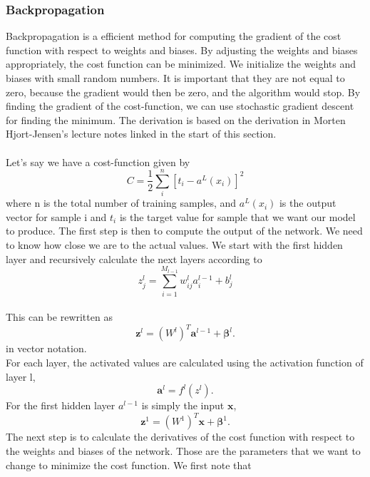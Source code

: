 \subsubsection{Backpropagation}
Backpropagation is a efficient method for computing the gradient of the cost function with respect to weights and biases. By adjusting the weights and biases appropriately, the cost function can be minimized. We initialize the weights and biases with small random numbers. It is important that they are not equal to zero, because the gradient would then be zero, and the algorithm would stop. By finding the gradient of the cost-function, we can use stochastic gradient descent for finding the minimum. The derivation is based on the derivation in Morten Hjort-Jensen's lecture notes linked in the start of this section. 
\\
\\
Let's say we have a cost-function given by 
\begin{equation}
    C = \frac{1}{2}\sum_i^n [t_i - a^L(x_i)]^2
\end{equation}
where n is the total number of training samples, and $a^L(x_i)$ is the output vector for sample i and $t_i$ is the target value for sample that we want our model to produce. 
The first step is then to compute the output of the network. We need to know how close we are to the actual values. We start with the first hidden layer and recursively calculate the next layers according to
\begin{equation}
    z_j^l = \sum_{i=1}^{M_{l-1}}w_{ij}^l a_i^{l-1} + b_j^l
\end{equation}
\\
This can be rewritten as 
\begin{equation}
    \boldsymbol{z}^l = (W^l)^T \boldsymbol{a}^{l-1} + \boldsymbol{\beta}^l.
\end{equation}
in vector notation.
\\
For each layer, the activated values are calculated using the activation function of layer l,
\begin{equation}
    \boldsymbol{a}^l = f^l(z^l). 
\end{equation}
For the first hidden layer $a^{l-1}$ is simply the input $\boldsymbol{x}$,
\begin{equation}
    \boldsymbol{z}^1 = (W^1)^T\boldsymbol{x} + \boldsymbol{\beta}^1.
\end{equation}
The next step is to calculate the derivatives of the cost function with respect to the weights and biases of the network. Those are the parameters that we want to change to minimize the cost function. We first note that  
